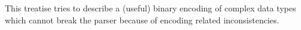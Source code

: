 This treatise tries to describe a (useful) binary encoding of complex
data types which cannot
break the parser because of encoding related inconsistencies.
